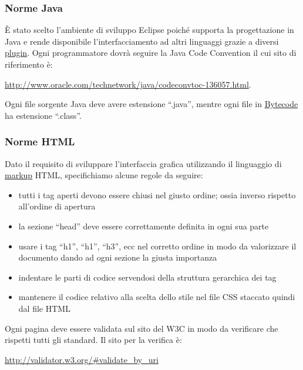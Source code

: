 \documentclass[a4paper,11pt]{article}
\begin{document}
\subsubsection{Norme Java}
\`E stato scelto l'ambiente di sviluppo Eclipse poich\'e supporta la progettazione in Java e rende disponibile l'interfacciamento ad altri linguaggi grazie a diversi \underline{plugin}. Ogni programmatore dovr\`a seguire la Java Code Convention il cui sito di riferimento \`e: \begin{center}
\url{http://www.oracle.com/technetwork/java/codeconvtoc-136057.html}.
\end{center}
Ogni file sorgente Java deve avere estensione ``.java'', mentre ogni file in \underline{Bytecode} ha estensione ``.class''.
\subsubsection{Norme HTML}
Dato il requisito di sviluppare l'interfaccia grafica utilizzando il linguaggio di \underline{markup} HTML, specifichiamo alcune regole da seguire:
\begin{itemize}
\item tutti i tag aperti devono essere chiusi nel giusto ordine; ossia inverso rispetto all'ordine di apertura  
\item la sezione ``head'' deve essere correttamente definita in ogni sua parte
\item usare i tag ``h1'', ``h1'', ``h3'', ecc nel corretto ordine in modo da valorizzare il documento dando ad ogni sezione la giusta importanza
\item indentare le parti di codice servendosi della struttura gerarchica dei tag
\item mantenere il codice relativo alla scelta dello stile nel file CSS staccato quindi dal file HTML
\end{itemize}
Ogni pagina deve essere validata sul sito del W3C in modo da verificare che rispetti tutti gli standard. Il sito per la verifica \`e:
\begin{center}
\url{http://validator.w3.org/#validate_by_uri}
\end{center}
\end{document}
